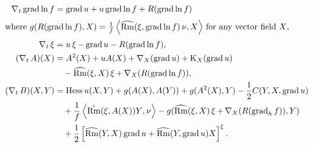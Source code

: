 \documentclass{amsart}
\begin{document}
\begin{lemma}
\label{lem:evolutions}
\begin{align*}
\D_t \grad \ln f &= \grad u + u \grad \ln f + R(\grad \ln f) \\
\intertext{where $g(R({\grad \ln f}), X) = \frac{1}{f} \ip{\widehat{\Rm}(\vel, \grad \ln f) \nor}{X}$ for any vector field $X$,}
\D_t \vel &= u\vel - \grad u - R(\grad \ln f), \\
(\D_t A)(X) &= A^2(X) + u A(X) + \nabla_X (\grad u) + \diff_X (\grad u) \\
&\quad - \widehat{\Rm} (\vel, X) \vel + \D_X (R(\grad \ln f)), \\
(\D_t B) (X, Y) &= \hess u (X, Y) + g(A(X), A(Y)) + g(A^2(X), Y) - \frac{1}{2} C(Y, X, \grad u) \\
&\quad +\frac{1}{f} \ip{\hat{\Rm} (\vel, A(X))Y}{\nor} - g(\widehat{\Rm}(\vel, X)\vel  + \D_X (R(\grad_h f)), Y) \\
&\quad + \frac{1}{2} \left[\widehat{\Rm} (Y, X)\grad u +  \widehat{\Rm} (Y, \grad u) X\right]^{\vel}.
\end{align*}
\end{lemma}
\end{document}
